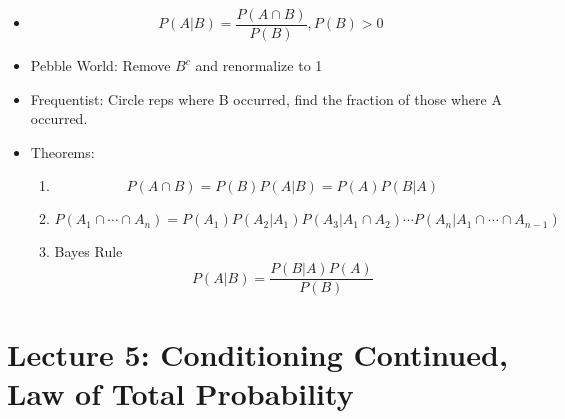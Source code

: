 \documentclass[11pt, oneside]{article}   	%
\begin{document}
\begin{itemize}
\begin{itemize}
					\item 
						\[
							P(A|B) = \frac{P(A \cap B)}{P(B)}, P(B) > 0
						\]
					\item Pebble World: Remove $B^{c}$ and renormalize to 1
					\item Frequentist: Circle reps where B occurred, find the fraction of those where A occurred. 
					\item Theorems:
						\begin{enumerate}
							\item
								\[
									P(A \cap B) = P(B) P(A|B) = P(A) P(B|A)
								\]
							\item
								\[ 
									P(A_1 \cap \cdots \cap A_n) = P(A_1)P(A_2|A_1)P(A_3|A_1 \cap A_2) \cdots P(A_n|A_1 \cap \cdots \cap A_{n-1})
								\]
							\item Bayes Rule
								\[ 
									P(A|B) = \frac{P(B|A) P(A)}{P(B)}
								\]
						\end{enumerate}
				\end{itemize}
		\end{itemize}
\break
\section{Lecture 5: Conditioning Continued, Law of Total Probability}
\end{document}
